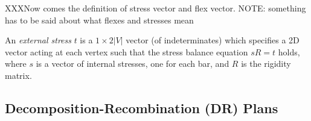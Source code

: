 XXXNow comes the definition of stress vector and flex vector. 
NOTE: something has to be said about what flexes and stresses mean

An {\em external stress} $t$ is a $1\times 2|V|$ vector  (of indeterminates)
which specifies a 2D vector acting at each vertex
such that the stress balance equation $sR = t$ holds, where $s$ is a vector
of internal stresses, one for each bar, and $R$ is the rigidity matrix.







\subsection*{Decomposition-Recombination (DR) Plans}


%
%
%
%
%
%




